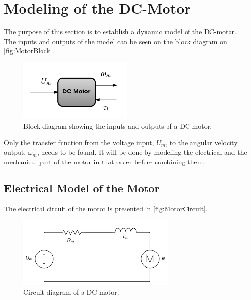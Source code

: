 \newpage
\section{Modeling of the DC-Motor}
\label{sec:ModelDCMotor}
The purpose of this section is to establish a dynamic model of the DC-motor. The inputs and outputs of the model can be seen on the block diagram on \autoref{fig:MotorBlock}.
\begin{figure}[htbp]
\centering
\includegraphics[width=0.5\textwidth]{figures/modeling/Motor/InputOutputMotor.pdf}
\caption{Block diagram showing the inputs and outputs of a DC motor.}
\label{fig:MotorBlock}
\end{figure}

Only the transfer function from the voltage input, $U_m$, to the angular velocity output, $\omega_m$, needs to be found. It will be done by modeling the electrical and the mechanical part of the motor in that order before combining them.

\subsection{Electrical Model of the Motor}
The electrical circuit of the motor is presented in \autoref{fig:MotorCircuit}.
\begin{figure}[htbp]
	\centering
 	\includegraphics[width=0.7\textwidth]{figures/modeling/Motor/MotorElectricCircuit.pdf} 
 	\caption{Circuit diagram of a DC-motor.}
 	\label{fig:MotorCircuit}
\end{figure}

